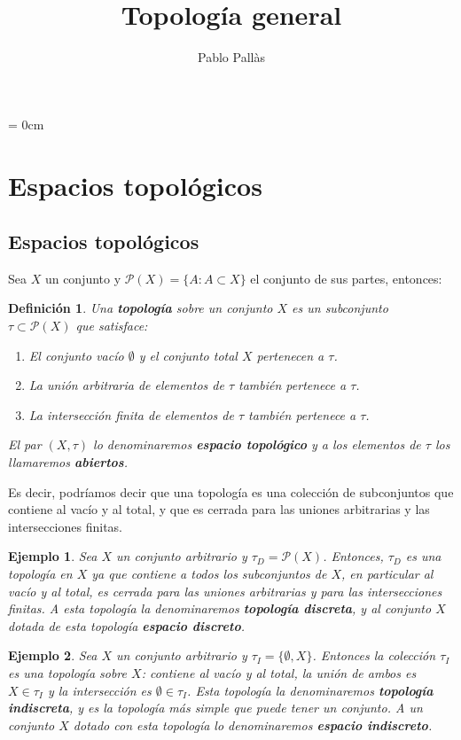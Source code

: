 \documentclass[12pt]{article}
\author{Pablo Pallàs}
\title{Topología general}
\newtheorem{definition}[theorem]{Definición}
\newtheorem{example}{Ejemplo}[theorem]
\begin{document}
\rmfamily
\maketitle
\tableofcontents
\parindent= 0cm

\section{Espacios topológicos}
\subsection{Espacios topológicos}
Sea $X$ un conjunto y $\mathcal{P}(X) = \lbrace A : A \subset X \rbrace$ el conjunto de sus partes, entonces:

\begin{definition}Una \textbf{topología} sobre un conjunto $X$ es un subconjunto $\tau \subset \mathcal{P}(X)$ que satisface: 
 \renewcommand{\theenumi}{\roman{enumi}} %
\begin{enumerate}
\item El conjunto vacío $\emptyset$ y el conjunto total $X$ pertenecen a $\tau$.
\item La unión arbitraria de elementos de $\tau$ también pertenece a $\tau$.
\item La intersección finita de elementos de $\tau$ también pertenece a $\tau$.
\end{enumerate}
El par $(X,\tau)$ lo denominaremos \textbf{espacio topológico} y a los elementos de $\tau$ los llamaremos \textbf{abiertos}.
\end{definition}

Es decir, podríamos decir que una topología es una colección de subconjuntos que contiene al vacío y al total, y que es cerrada para las uniones arbitrarias y las intersecciones finitas.

\begin{example}Sea $X$ un conjunto arbitrario y $\tau_D = \mathcal{P}(X)$. Entonces, $\tau_D$ es una topología en $X$ ya que contiene a todos los subconjuntos de $X$, en particular al vacío y al total, es cerrada para las uniones arbitrarias y para las intersecciones finitas. A esta topología la denominaremos \textbf{topología discreta}, y al conjunto $X$ dotada de esta topología \textbf{espacio discreto}.
\end{example}
\begin{example}Sea $X$ un conjunto arbitrario y $\tau_I = \lbrace \emptyset, X \rbrace$. Entonces la colección $\tau_I$ es una topología sobre $X$: contiene al vacío y al total, la unión de ambos es $X \in \tau_I$ y la intersección es $\emptyset \in \tau_I$. Esta topología la denominaremos \textbf{topología indiscreta}, y es la topología más simple que puede tener un conjunto. A un conjunto $X$ dotado con esta topología lo denominaremos \textbf{espacio indiscreto}.
\end{example}
\end{document}
